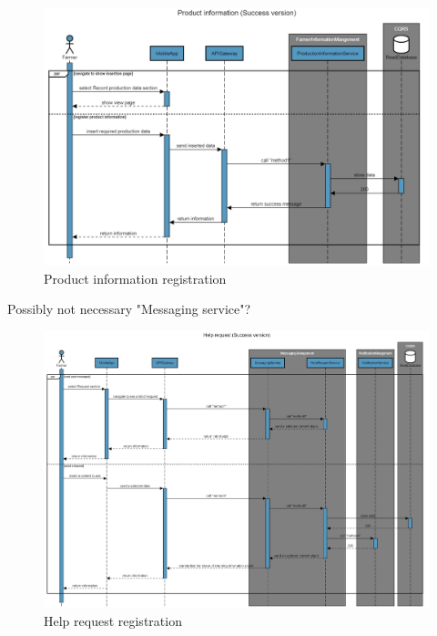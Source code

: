 \begin{figure}[H]
	\centering
    \includegraphics[width=\textwidth]{Images/sequence-diagram/product-info.png}
	\caption{\label{fig:se_product}Product information registration}
\end{figure}

Possibly not necessary "Messaging service"?
\begin{figure}[H]
	\centering
    \includegraphics[width=\textwidth]{Images/sequence-diagram/help-request.png}
	\caption{\label{fig:se_help}Help request registration}
\end{figure}

